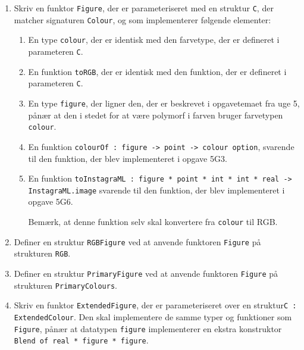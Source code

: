 \documentclass[a4paper,12pt]{article}
\begin{document}
\begin{enumerate}[{7}F1]
\item Skriv en funktor \lstinline{Figure}, der er parameteriseret med
  en struktur \lstinline{C}, der matcher signaturen \lstinline{Colour},
  og som implementerer følgende elementer:

\begin{enumerate}[1.]

\item En type \lstinline{colour}, der er identisk med den farvetype, der
  er defineret i parameteren \lstinline{C}.

\item En funktion \lstinline{toRGB}, der er identisk med den funktion, der
  er defineret i parameteren \lstinline{C}.

\item En type \lstinline{figure}, der ligner den, der er beskrevet i
  opgavetemaet fra uge 5, pånær at den i stedet for at være polymorf i
  farven bruger farvetypen \lstinline{colour}.

\item En funktion \lstinline{colourOf : figure -> point -> colour option},
  svarende til den funktion, der blev implementeret i opgave 5G3.

\item En funktion\newline
\lstinline{toInstagraML : figure * point * int * int * real -> InstagraML.image}\newline
svarende til den funktion, der blev implementeret i opgave 5G6.

Bemærk, at denne funktion selv skal konvertere fra \texttt{colour} til RGB.
\end{enumerate}

\item Definer en struktur \lstinline{RGBFigure} ved at anvende
  funktoren \lstinline{Figure} på strukturen \lstinline{RGB}.

\item Definer en struktur \lstinline{PrimaryFigure} ved at anvende
  funktoren \lstinline{Figure} på strukturen \lstinline{PrimaryColours}.

\item Skriv en funktor \lstinline{ExtendedFigure}, der er
  parameteriseret over en struktur\newline \lstinline{C : ExtendedColour}.
  Den skal implementere de samme typer og funktioner som \lstinline{Figure},
  pånær at datatypen \lstinline{figure} implementerer en ekstra konstruktor\newline
  \lstinline{Blend of real * figure * figure}.


\end{enumerate}
\end{document}
